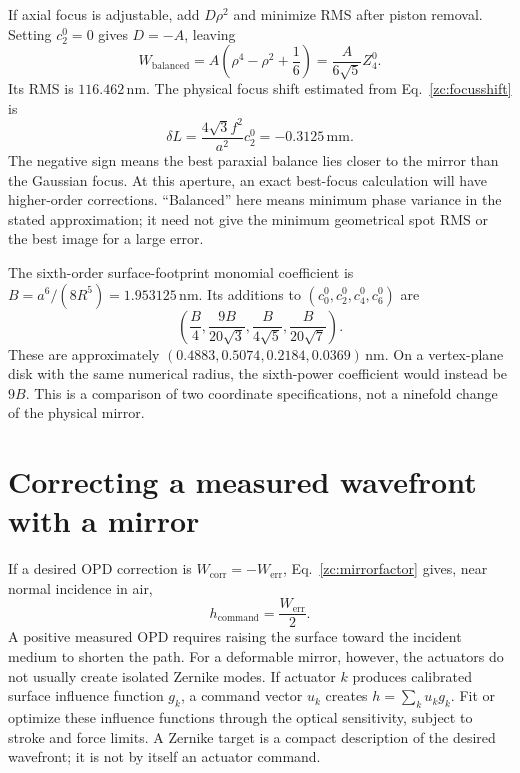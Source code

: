 If axial focus is adjustable, add $D\rho^2$ and minimize RMS after
piston removal. Setting $c_2^0=0$ gives $D=-A$, leaving
\begin{equation}
 W_{\mathrm{balanced}}=A\left(\rho^4-\rho^2+\frac16\right)
                =\frac{A}{6\sqrt5}Z_4^0.
\end{equation}
Its RMS is $116.462\,\mathrm{nm}$. The physical focus shift estimated
from Eq.~\eqref{zc:focusshift} is
\begin{equation}
 \delta L=\frac{4\sqrt3f^2}{a^2}c_2^0=-0.3125\,\mathrm{mm}.
\end{equation}
The negative sign means the best paraxial balance lies closer to the
mirror than the Gaussian focus. At this aperture, an exact best-focus
calculation will have higher-order corrections. ``Balanced'' here means
minimum phase variance in the stated approximation; it need not give
the minimum geometrical spot RMS or the best image for a large error.

The sixth-order surface-footprint monomial coefficient is
$B=a^6/(8R^5)=1.953125\,\mathrm{nm}$. Its additions to
$(c_0^0,c_2^0,c_4^0,c_6^0)$ are
\begin{equation}
 \left(\frac B4,\frac{9B}{20\sqrt3},
                 \frac B{4\sqrt5},\frac B{20\sqrt7}\right).
\end{equation}
These are approximately $(0.4883,0.5074,0.2184,0.0369)\,\mathrm{nm}$.
On a vertex-plane disk with the same numerical radius, the sixth-power
coefficient would instead be $9B$. This is a comparison of two
coordinate specifications, not a ninefold change of the physical mirror.

\section{Correcting a measured wavefront with a mirror}
If a desired OPD correction is $W_{\mathrm{corr}}=-W_{\mathrm{err}}$,
Eq.~\eqref{zc:mirrorfactor} gives, near normal incidence in air,
\begin{equation}
 h_{\mathrm{command}}=\frac{W_{\mathrm{err}}}{2}.
\end{equation}
A positive measured OPD requires raising the surface toward the incident
medium to shorten the path. For a deformable mirror, however, the
actuators do not usually create isolated Zernike modes. If actuator $k$
produces calibrated surface influence function $g_k$, a command vector
$u_k$ creates $h=\sum_k u_kg_k$. Fit or optimize these influence
functions through the optical sensitivity, subject to stroke and force
limits. A Zernike target is a compact description of the desired
wavefront; it is not by itself an actuator command.

